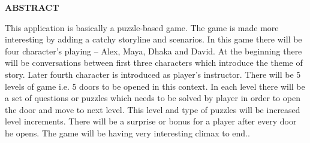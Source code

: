 \normalsize
\newpage
\begin{center}
\huge \textbf{ABSTRACT}
\end{center}
This application is basically a puzzle-based game. The game is made more interesting by adding a catchy storyline and scenarios. In this game there will be four character’s playing – Alex, Maya, Dhaka and David. At the beginning there will be conversations between first three characters which introduce the theme of story. Later fourth character is introduced as player’s instructor. There will be 5 levels of game i.e. 5 doors to be opened in this context. In each level there will be a set of questions or puzzles which needs to be solved by player in order to open the door and move to next level. This level and type of puzzles will be increased level increments. There will be a surprise or bonus for a player after every door he opens. The game will be having very interesting climax to end.. \\
						
											
\begin{flushleft}
\textsl {\textbf}
\end{flushleft}


